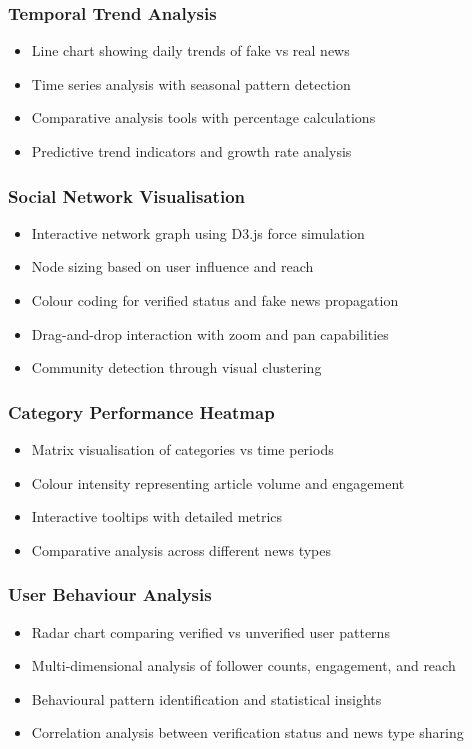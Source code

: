 \documentclass[12pt,a4paper]{article}
\begin{document}
\subsubsection{Temporal Trend Analysis}
\begin{itemize}
    \item Line chart showing daily trends of fake vs real news
    \item Time series analysis with seasonal pattern detection
    \item Comparative analysis tools with percentage calculations
    \item Predictive trend indicators and growth rate analysis
\end{itemize}

\subsubsection{Social Network Visualisation}
\begin{itemize}
    \item Interactive network graph using D3.js force simulation
    \item Node sizing based on user influence and reach
    \item Colour coding for verified status and fake news propagation
    \item Drag-and-drop interaction with zoom and pan capabilities
    \item Community detection through visual clustering
\end{itemize}

\subsubsection{Category Performance Heatmap}
\begin{itemize}
    \item Matrix visualisation of categories vs time periods
    \item Colour intensity representing article volume and engagement
    \item Interactive tooltips with detailed metrics
    \item Comparative analysis across different news types
\end{itemize}

\subsubsection{User Behaviour Analysis}
\begin{itemize}
    \item Radar chart comparing verified vs unverified user patterns
    \item Multi-dimensional analysis of follower counts, engagement, and reach
    \item Behavioural pattern identification and statistical insights
    \item Correlation analysis between verification status and news type sharing
\end{itemize}
\end{document}
